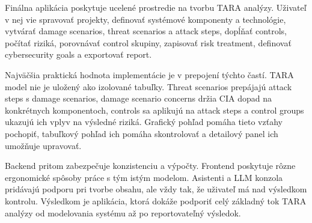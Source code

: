 \documentclass[11pt]{article}
\begin{document}
Finálna aplikácia poskytuje ucelené prostredie na tvorbu TARA analýzy. Uživateľ v nej vie spravovať projekty, definovať systémové komponenty a technológie, vytvárať damage scenarios, threat scenarios a attack steps, dopĺňať controls, počítať riziká, porovnávať control skupiny, zapisovať risk treatment, definovať cybersecurity goals a exportovať report.

Najväčšia praktická hodnota implementácie je v prepojení týchto častí. TARA model nie je uložený ako izolované tabuľky. Threat scenarios prepájajú attack steps s damage scenarios, damage scenario concerns držia CIA dopad na konkrétnych komponentoch, controls sa aplikujú na attack steps a control groups ukazujú ich vplyv na výsledné riziká. Grafický pohľad pomáha tieto vzťahy pochopiť, tabuľkový pohľad ich pomáha skontrolovať a detailový panel ich umožňuje upravovať.

Backend pritom zabezpečuje konzistenciu a výpočty. Frontend poskytuje rôzne ergonomické spôsoby práce s tým istým modelom. Asistenti a LLM konzola pridávajú podporu pri tvorbe obsahu, ale vždy tak, že uživateľ má nad výsledkom kontrolu. Výsledkom je aplikácia, ktorá dokáže podporiť celý základný tok TARA analýzy od modelovania systému až po reportovateľný výsledok.
\end{document}
